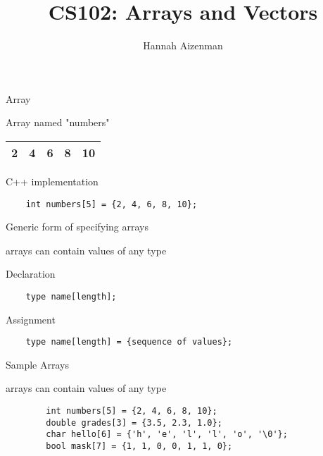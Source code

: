 \documentclass[xcolor={dvipsnames}]{beamer}
\begin{document}
\title{ CS102: Arrays and Vectors}
\author{Hannah Aizenman}


\begin{frame}
	\titlepage
\end{frame}


\begin{frame}[fragile]{Array}
	\begin{block}{Array named "numbers"}
	\begin{table}
	\Huge
	\begin{tabular}{|c|c|c|c|c|}
	\hline
	2  & 4 & 6 & 8 & 10\\
	\hline
	\end{tabular}
	\end{table}
	\end{block}
	\pause
	\begin{block}{C++ implementation}
	\begin{verbatim}
	int numbers[5] = {2, 4, 6, 8, 10};
	\end{verbatim}
	\end{block}
\end{frame}

\begin{frame}[fragile]{Generic form of specifying arrays}
\begin{center}
	arrays can contain values of any type
\end{center}
\begin{block}{Declaration}
	\begin{verbatim}
	type name[length];
	\end{verbatim}
\end{block}
\begin{block}{Assignment}
	\begin{verbatim}
	type name[length] = {sequence of values};
	\end{verbatim}
	\end{block}
\end{frame}

\begin{frame}[fragile]{Sample Arrays}
	\begin{center}
		arrays can contain values of any type
	\end{center}
	\begin{verbatim}
		int numbers[5] = {2, 4, 6, 8, 10};
		double grades[3] = {3.5, 2.3, 1.0};
		char hello[6] = {'h', 'e', 'l', 'l', 'o', '\0'};
		bool mask[7] = {1, 1, 0, 0, 1, 1, 0};
	\end{verbatim}
\end{frame}
\end{document}
